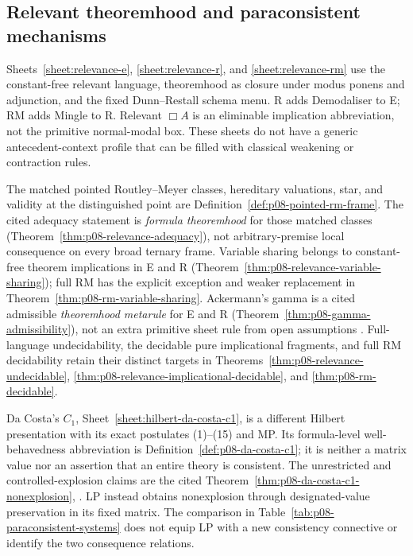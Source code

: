 
\subsection{Relevant theoremhood and paraconsistent mechanisms}

Sheets~\ref{sheet:relevance-e}, \ref{sheet:relevance-r}, and
\ref{sheet:relevance-rm} use the constant-free relevant language, theoremhood
as closure under modus ponens and adjunction, and the fixed Dunn--Restall
schema menu.  R adds Demodaliser to E; RM adds Mingle to R.  Relevant
\(\Box A\) is an eliminable implication abbreviation, not the primitive
normal-modal box.  These sheets do not have a generic antecedent-context
profile that can be filled with classical weakening or contraction rules.

The matched pointed Routley--Meyer classes, hereditary valuations, star,
and validity at the distinguished point are
Definition~\ref{def:p08-pointed-rm-frame}.  The cited adequacy statement is
\emph{formula theoremhood} for those matched classes
(Theorem~\ref{thm:p08-relevance-adequacy}), not arbitrary-premise local
consequence on every broad ternary frame.  Variable sharing belongs to
constant-free theorem implications in E and R
(Theorem~\ref{thm:p08-relevance-variable-sharing}); full RM has the explicit
exception and weaker replacement in
Theorem~\ref{thm:p08-rm-variable-sharing}.  Ackermann's gamma is a cited
admissible \emph{theoremhood metarule} for E and R
(Theorem~\ref{thm:p08-gamma-admissibility}), not an extra primitive sheet
rule from open assumptions \cite{AndersonBelnap1975,MeyerDunn1969,
DunnRestall2002}.  Full-language undecidability, the decidable pure
implicational fragments, and full RM decidability retain their distinct
targets in Theorems~\ref{thm:p08-relevance-undecidable},
\ref{thm:p08-relevance-implicational-decidable}, and
\ref{thm:p08-rm-decidable}.

Da Costa's \(C_1\), Sheet~\ref{sheet:hilbert-da-costa-c1}, is a different
Hilbert presentation with its exact postulates (1)--(15) and MP.
Its formula-level well-behavedness abbreviation is
Definition~\ref{def:p08-da-costa-c1}; it is neither a matrix value nor an
assertion that an entire theory is consistent.  The unrestricted and
controlled-explosion claims are the cited
Theorem~\ref{thm:p08-da-costa-c1-nonexplosion}, \cite{daCosta1974}.
LP instead obtains nonexplosion through designated-value preservation in
its fixed matrix.  The comparison in Table~\ref{tab:p08-paraconsistent-systems}
does not equip LP with a new consistency connective or identify the two
consequence relations.

